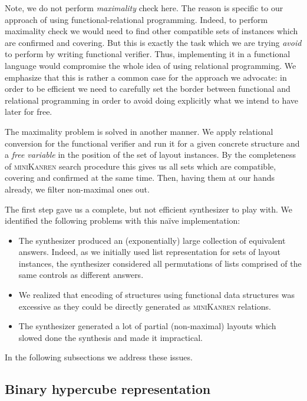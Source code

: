 Note, we do not perform \emph{maximality} check here.
The reason is specific to our approach of using functional-relational programming.
Indeed, to perform maximality check we would need to
find other compatible sets of instances which are confirmed and covering. But this is exactly the
task which we are trying \emph{avoid} to perform by writing functional verifier.
Thus, implementing it in a functional language would compromise the whole idea of using relational
programming. We emphasize that this is rather a common case for the approach we advocate: in order
to be efficient we need to carefully set the border between functional and relational programming
in order to avoid doing explicitly what we intend to have later for free.

The maximality problem is solved in another manner. We apply relational conversion for the
functional verifier and run it for a given concrete structure and a \emph{free variable} in
the position of the set of layout instances. By the completeness of \textsc{miniKanren}
search procedure this gives us all sets which are compatible, covering and confirmed at
the same time. Then, having them at our hands already, we filter non-maximal ones out.

The first step gave us a complete, but not efficient synthesizer to play with. We identified
the following problems with this na\"ive implementation:

\begin{itemize}
\item The synthesizer produced an (exponentially) large collection of equivalent answers. Indeed, as
  we initially used list representation for sets of layout instances, the synthesizer
  considered all permutations of lists comprised of the same controls as different answers.
\item We realized that encoding of structures using functional data structures was
  excessive as they could be directly generated as \textsc{miniKanren} relations.
\item The synthesizer generated a lot of partial (non-maximal) layouts which slowed
  done the synthesis and made it impractical.
\end{itemize}

In the following subsections we address these issues.

\subsection{Binary hypercube representation}

